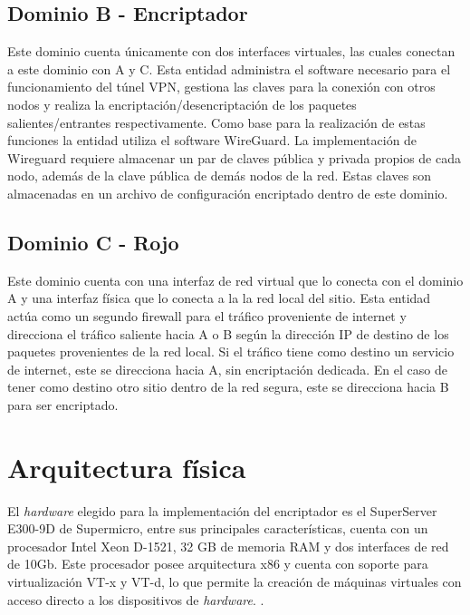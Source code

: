 \subsection{Dominio B - Encriptador}
Este dominio cuenta únicamente con dos interfaces virtuales, las cuales conectan a este dominio con A y C. Esta entidad administra el software necesario para el funcionamiento del túnel VPN, gestiona las claves para la conexión con otros nodos y realiza la encriptación/desencriptación de los paquetes salientes/entrantes respectivamente. Como base para la realización de estas funciones la entidad utiliza el software WireGuard.
La implementación de Wireguard requiere almacenar un par de claves pública y privada propios de cada nodo, además de la clave pública de demás nodos de la red. Estas claves son almacenadas en un archivo de configuración encriptado dentro de este dominio.

\subsection{Dominio C - Rojo}
Este dominio cuenta con una interfaz de red virtual que lo conecta con el dominio A y una interfaz física que lo conecta a la la red local del sitio. Esta entidad actúa como un segundo firewall para el tráfico proveniente de internet y direcciona el tráfico saliente hacia A o B según la dirección IP de destino de los paquetes provenientes de la red local. Si el tráfico tiene como destino un servicio de internet, este se direcciona hacia A, sin encriptación dedicada. En el caso de tener como destino otro sitio dentro de la red segura, este se direcciona hacia B para ser encriptado.




\section{Arquitectura física}

El \textit{hardware} elegido para la implementación del encriptador es el SuperServer E300-9D de Supermicro, entre sus principales características, cuenta con un procesador Intel Xeon D-1521, 32 GB de memoria RAM y dos interfaces de red  de 10Gb. Este procesador posee arquitectura x86 y cuenta con soporte para virtualización VT-x y VT-d, lo que permite la creación de máquinas virtuales con acceso directo a los dispositivos de \textit{hardware}. .

